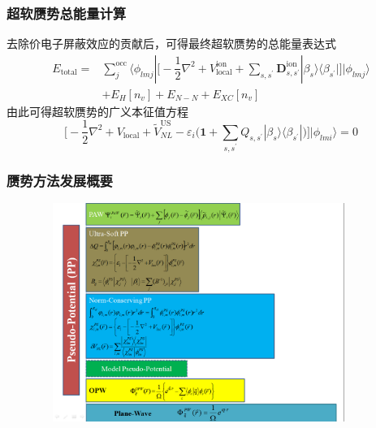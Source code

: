 \documentclass[cjk,slidestop,compress,mathserif,blue]{beamer}
\begin{document}
\frame
{
	\frametitle{超软赝势总能量计算}
	去除价电子屏蔽效应的贡献后，可得最终超软赝势的总能量表达式
	\begin{displaymath}
		\begin{aligned}
			E_{\mathrm{total}}=&\sum_j^{\mathrm{occ}}\langle\phi_{lmj}|\bigg[-\dfrac12\nabla^2+V_{\mathrm{local}}^{\mathrm{ion}}+\sum_{s,s^{\prime}}\mathbf{D}_{s,s^{\prime}}^{\mathrm{ion}}|\beta_s\rangle\langle\beta_{s^{\prime}}|\bigg]|\phi_{lmj}\rangle\\
			&+E_{H}[n_v]+E_{N-N}+E_{XC}[n_v]
		\end{aligned}
	\end{displaymath}
	{\fontsize{7.2pt}{5.2pt}}
	由此可得超软赝势的广义本征值方程
	$$\bigg[-\dfrac12\nabla^2+V_{\mathrm{local}}+\tilde V_{NL}^{\mathrm{US}}-\varepsilon_i\bigg(\mathbf{1}+\sum_{s,s^{\prime}}Q_{s,s^{\prime}}|\beta_s\rangle\langle\beta_{s^{\prime}}|\bigg)\bigg]|\phi_{lmi}\rangle=0$$
}

\frame
{
	\frametitle{赝势方法发展概要}
\begin{figure}[h!]
\centering
\vspace*{-0.25in}
\includegraphics[height=2.80in,width=4.10in,viewport=0 0 1190 875,clip]{Figures/Pseudo_Potential.png}
\label{Pseudo_Poential}
\end{figure}
}
\end{document}
